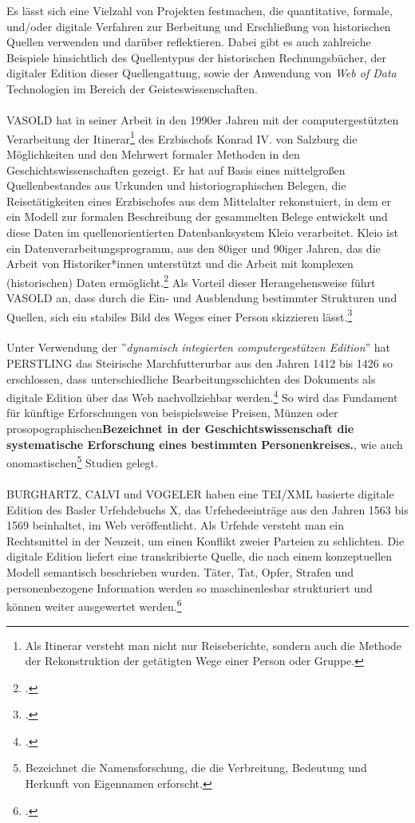 \documentclass[12pt,a4paper]{article}
\begin{document}
Es lässt sich eine Vielzahl von Projekten festmachen, die quantitative, formale, und/oder digitale Verfahren zur Berbeitung und Erschließung von historischen Quellen verwenden und darüber reflektieren. Dabei gibt es auch zahlreiche Beispiele hinsichtlich des Quellentypus der historischen Rechnungsbücher, der digitaler Edition dieser Quellengattung, sowie der Anwendung von \textit{Web of Data} Technologien im Bereich der Geisteswissenschaften.
\\
\\
VASOLD hat in seiner Arbeit in den 1990er Jahren mit der computergestützten Verarbeitung der Itinerar\footnote{Als Itinerar versteht man nicht nur Reiseberichte, sondern auch die Methode der Rekonstruktion der getätigten Wege einer Person oder Gruppe.} des Erzbischofs Konrad IV. von Salzburg die Möglichkeiten und den Mehrwert formaler Methoden in den Geschichtswissenschaften gezeigt. Er hat auf Basis eines mittelgroßen Quellenbestandes aus Urkunden und historiographischen Belegen, die Reisetätigkeiten eines Erzbischofes aus dem Mittelalter rekonstuiert, in dem er ein Modell zur formalen Beschreibung der gesammelten Belege entwickelt und diese Daten im quellenorientierten Datenbanksystem Kleio verarbeitet. Kleio ist ein Datenverarbeitungsprogramm, aus den 80iger und 90iger Jahren, das die Arbeit von Historiker*innen unterstützt und die Arbeit mit komplexen (historischen) Daten ermöglicht.\footcite[][S.172-174]{hoffmann1990ehepaare}  Als Vorteil dieser Herangehensweise führt VASOLD an, dass durch die Ein- und Ausblendung bestimmter Strukturen und Quellen, sich ein stabiles Bild des Weges einer Person skizzieren lässt.\footcite{vasold1996itinerar}
\\
\\
Unter Verwendung der ''\textit{dynamisch integierten computergestützen Edition}'' hat PERSTLING das Steirische Marchfutterurbar aus den Jahren 1412 bis 1426 so erschlossen, dass unterschiedliche Bearbeitungsschichten des Dokuments als digitale Edition über das Web nachvollziehbar werden.\footcite{PerstlingMatthias2013MDuE} So wird das Fundament für künftige  Erforschungen von beispielsweise Preisen, Münzen oder prosopographischen\textbf{Bezeichnet in der Geschichtswissenschaft die systematische Erforschung eines bestimmten Personenkreises.}, wie  auch onomastischen\footnote{Bezeichnet die Namensforschung, die die Verbreitung, Bedeutung und Herkunft von Eigennamen erforscht.} Studien gelegt.
\\
\\
BURGHARTZ, CALVI und VOGELER haben eine TEI/XML basierte digitale Edition des Basler Urfehdebuchs X, das Urfehedeeinträge aus den Jahren 1563 bis 1569 beinhaltet, im Web veröffentlicht. Als Urfehde versteht man ein Rechtsmittel in der Neuzeit, um einen Konflikt zweier Parteien zu schlichten. Die digitale Edition liefert eine transkribierte Quelle, die nach einem konzeptuellen Modell semantisch beschrieben wurden. Täter, Tat, Opfer, Strafen und personenbezogene Information werden so maschinenlesbar strukturiert und können weiter ausgewertet werden.\footcite[][S.27-29]{pollin2017semantically} 
\end{document}
